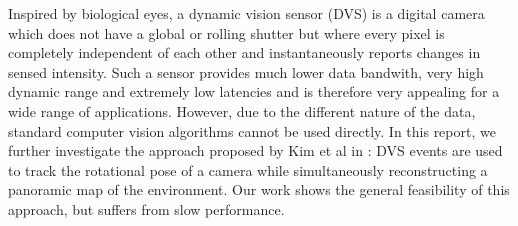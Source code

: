 Inspired by biological eyes, a dynamic vision sensor (DVS) is a digital camera
which does not have a global or rolling shutter but where every pixel is
completely independent of each other and instantaneously reports changes in
sensed intensity.
Such a sensor provides much lower data bandwith, very high dynamic range and
extremely low latencies and is therefore very appealing for a wide range of
applications. However, due to the different nature of the data, standard
computer vision algorithms cannot be used directly.
In this report, we further investigate the approach proposed by Kim et al in
\cite{kim2014simultaneous}: DVS events are used to track the rotational pose of
a camera while simultaneously reconstructing a panoramic map of the
environment. Our work shows the general feasibility of this approach, but
suffers from slow performance.
